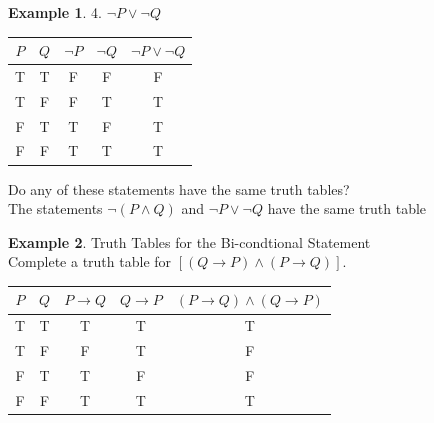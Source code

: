 \documentclass{book}
\theoremstyle{definition}
\newtheorem{example}{Example}[definition]
\theoremstyle{remark}
\begin{document}
\begin{example}
4. $\neg P \vee \neg Q$ \\

\begin{center}
    \begin{tabular}{|c|c|c|c|c|}
        \hline 
        $P$ & $Q$ & $\neg P$ & $\neg Q$ & $\neg P \vee \neg Q$\\ 
        \hline 
        T & T & F & F & F \\ 
        \hline 
        T & F & F & T & T \\ 
        \hline 
        F & T & T & F & T \\ 
        \hline 
        F & F & T & T & T \\ 
        \hline 
    \end{tabular} 
\end{center}


Do any of these statements have the same truth tables? \\ 
The statements $\neg (P \wedge Q)$ and $\neg P \vee \neg Q$ have the same truth table
\end{example}


\begin{example}
Truth Tables for the Bi-condtional Statement \cite[Chap.2, P.C.1.1]{ted} \\

Complete a truth table for $[(Q \to P) \wedge (P \to Q)]$.

\begin{center}
    \begin{tabular}{|c|c|c|c|c|}
        \hline 
        $P$ & $Q$ & $P \to Q$ & $Q \to P$ & $(P \to Q) \wedge (Q \to P)$ \\ 
        \hline 
        T & T & T & T & T \\ 
        \hline 
        T & F & F & T & F \\ 
        \hline 
        F & T & T & F & F \\ 
        \hline 
        F & F & T & T & T \\ 
        \hline 
    \end{tabular} 
\end{center}
\end{example}
\end{document}
